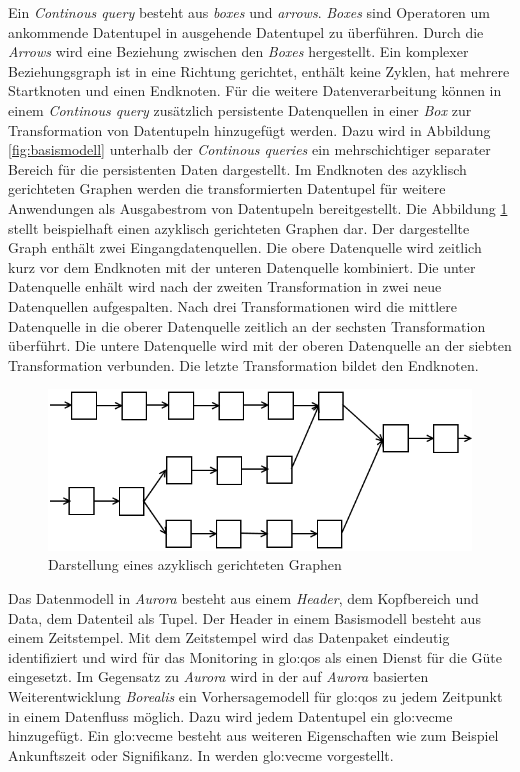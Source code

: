 Ein \textit{Continous query} besteht aus \textit{boxes }und \textit{arrows}. \textit{Boxes} sind Operatoren um ankommende Datentupel in ausgehende Datentupel zu überführen. Durch die \textit{Arrows} wird eine Beziehung zwischen den \textit{Boxes} hergestellt. Ein komplexer Beziehungsgraph ist in eine Richtung gerichtet, enthält keine Zyklen, hat mehrere Startknoten und einen Endknoten. Für die weitere Datenverarbeitung können in einem \textit{Continous query} zusätzlich persistente Datenquellen in einer \textit{Box} zur Transformation von Datentupeln hinzugefügt werden. Dazu wird in Abbildung \ref{fig:basismodell} unterhalb der \textit{Continous queries} ein mehrschichtiger separater Bereich für die persistenten Daten dargestellt. Im Endknoten des azyklisch gerichteten Graphen werden die transformierten Datentupel für weitere Anwendungen als Ausgabestrom von Datentupeln bereitgestellt. Die Abbildung \ref{fig:dag} stellt beispielhaft einen azyklisch gerichteten Graphen dar. Der dargestellte Graph enthält zwei Eingangdatenquellen. Die obere Datenquelle wird zeitlich kurz vor dem Endknoten mit der unteren Datenquelle kombiniert. Die unter Datenquelle enhält wird nach der zweiten Transformation in zwei neue Datenquellen aufgespalten. Nach drei Transformationen wird die mittlere Datenquelle in die oberer Datenquelle zeitlich an der sechsten Transformation überführt. Die untere Datenquelle wird mit der oberen Datenquelle an der siebten Transformation verbunden. Die letzte Transformation bildet den Endknoten.

\begin{figure}[htb!]
\centering
\includegraphics[width=1.0\textwidth]{bilder/DAG.png}
\caption{Darstellung eines azyklisch gerichteten Graphen
\label{fig:dag}}
\end{figure}

Das Datenmodell in \textit{Aurora} besteht aus einem \textit{Header}, dem Kopfbereich und Data, dem Datenteil als Tupel. Der Header in einem Basismodell besteht aus einem Zeitstempel. Mit dem Zeitstempel wird das Datenpaket eindeutig identifiziert und wird für das Monitoring in \gls{glo:qos} als einen Dienst für die Güte eingesetzt. Im Gegensatz zu \textit{Aurora} wird in der auf \textit{Aurora} basierten Weiterentwicklung \textit{Borealis} ein Vorhersagemodell für \gls{glo:qos} zu jedem Zeitpunkt in einem Datenfluss möglich. Dazu wird jedem Datentupel ein \gls{glo:vecme} hinzugefügt. Ein \gls{glo:vecme} besteht aus weiteren Eigenschaften wie zum Beispiel Ankunftszeit oder Signifikanz. In  werden \acrlong{glo:vecme} vorgestellt.

